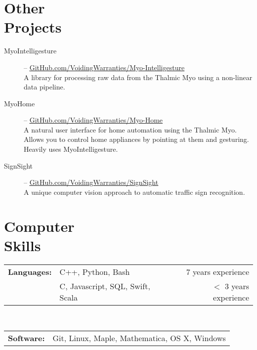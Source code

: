 \documentclass[margin]{res}
\begin{document}
\begin{minipage}{\textwidth}
\begin{resume}
\section{Other \\ Projects}
\begin{description}
	\item[MyoIntelligesture] -- \uline{\href{http://GitHub.com/VoidingWarranties/Myo-Intelligesture}{GitHub.com/VoidingWarranties/Myo-Intelligesture}} \\
		A library for processing raw data from the Thalmic Myo using a non-linear data pipeline.
	\item[MyoHome] -- \uline{\href{http://GitHub.com/VoidingWarranties/Myo-Home}{GitHub.com/VoidingWarranties/Myo-Home}} \\
		A natural user interface for home automation using the Thalmic Myo. Allows you to control home appliances by pointing at them and gesturing. Heavily uses MyoIntelligesture.
	\item[SignSight] -- \uline{\href{http://GitHub.com/VoidingWarranties/SignSight}{GitHub.com/VoidingWarranties/SignSight}} \\
		A unique computer vision approach to automatic traffic sign recognition.
\end{description}

\section{Computer \\ Skills}
\begin{tabular}{l l r}
		{\bf Languages:} & C++, Python, Bash & 7 years experience \\
		                 & C, Javascript, SQL, Swift, Scala & $<$ 3 years experience \\
\end{tabular} \\
\bgroup
\def\arraystretch{1.23} %
\begin{tabular}{l p{4in}}
		{\bf Software:} & Git, Linux, Maple, Mathematica, OS X, Windows \\
 \end{tabular}
\egroup


\end{resume}
\end{minipage}
\end{document}
